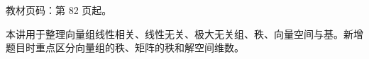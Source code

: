 
\begin{knowledgeBox}
教材页码：第 82 页起。

本讲用于整理向量组线性相关、线性无关、极大无关组、秩、向量空间与基。新增题目时重点区分向量组的秩、矩阵的秩和解空间维数。
\end{knowledgeBox}
